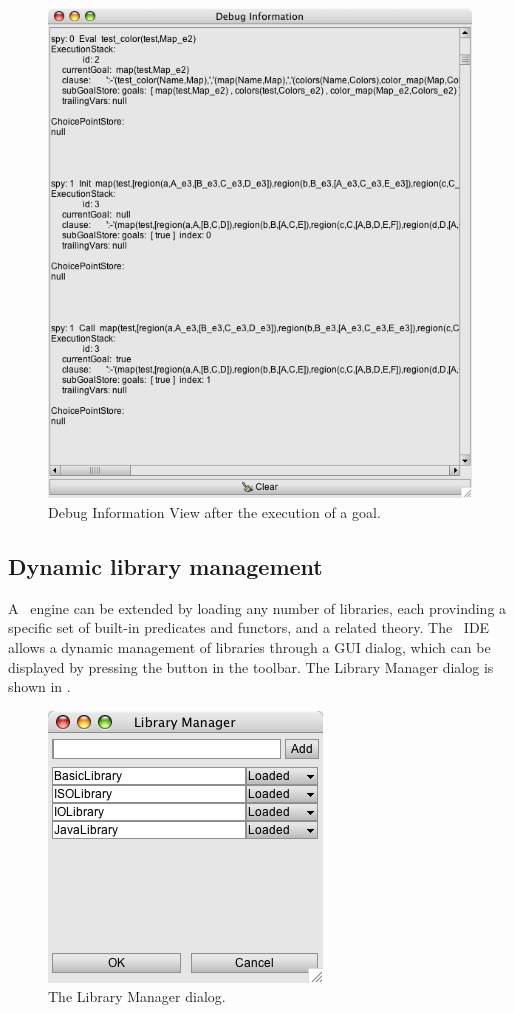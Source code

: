 \begin{figure}
\centering
\includegraphics[scale=0.605]{images/viewDebugInformation}
\caption{Debug Information View after the execution of a goal.}
\label{view-debug-information}
\end{figure}

\subsection{Dynamic library management}


A \tuprolog\ engine can be extended by loading any number of libraries, each provinding a specific set of built-in
predicates and functors, and a related theory. The \tuprolog\ IDE allows a dynamic management of libraries through a
GUI dialog, which can be displayed by pressing the  button in the toolbar. The Library
Manager dialog is shown in .

\begin{figure}
\centering
\includegraphics[scale=0.605]{images/libraryManagerDialog}
\caption{The Library Manager dialog.}
\label{library-manager-dialog}
\end{figure}

